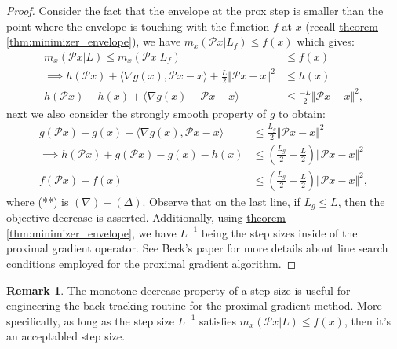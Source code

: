 \documentclass[]{article}
\theoremstyle{definition}
\newtheorem{remark}{Remark}[subsection]
{
    \newtheorem{assumption}{Assumption}
}
\begin{document}
        \begin{proof}Consider the fact that the envelope at the prox step is smaller than the point where the envelope is touching with the function $f$ at $x$ (recall \hyperref[thm:minimizer_envelope]{theorem \ref*{thm:minimizer_envelope}}), we have $m_x(\mathcal Px|L_f)\le f(x)$ which gives: 
            \begin{align*}
                m_x(\mathcal Px|L) \le m_x(\mathcal Px|L_f) 
                &\le f(x)
                \\
                \implies h(\mathcal Px)+ 
                \langle \nabla g(x), \mathcal P x - x\rangle + \frac{L}{2}\Vert \mathcal Px - x\Vert^2 
                &\le h(x)
                \\
                h(\mathcal Px) - h(x) + \langle \nabla g(x) - \mathcal Px - x\rangle 
                &\le \frac{-L}{2} \Vert \mathcal Px - x\Vert^2, \tag{$\Delta$}
            \end{align*}
            next we also consider the strongly smooth property of $g$ to obtain: 
            \begin{align*}
                g(\mathcal Px) - g(x) - \langle \nabla g(x), \mathcal Px - x\rangle 
                & \le \frac{L_g}{2}\Vert \mathcal Px - x\Vert^2 \tag{$\nabla$}
                \\
                \implies
                h(\mathcal Px) + g(\mathcal Px) - g(x) - h(x)
                &\le 
                \left(
                    \frac{L_g}{2} - \frac{L}{2}
                \right)\Vert \mathcal Px - x\Vert^2 \tag{**}
                \\
                f(\mathcal Px) - f(x) 
                &\le
                \left(
                    \frac{L_g}{2} - \frac{L}{2}
                \right)\Vert \mathcal Px - x\Vert^2, 
            \end{align*}
            where (**) is $(\nabla) + (\Delta)$. Observe that on the last line, if $L_g \le L$, then the objective decrease is asserted. Additionally, using \hyperref[thm:minimizer_envelope]{theorem \ref*{thm:minimizer_envelope}}, we have $L^{-1}$ being the step sizes inside of the proximal gradient operator. See Beck's paper \cite{paper:FISTA} for more details about line search conditions employed for the proximal gradient algorithm.
        \end{proof}
        \begin{remark}
            The monotone decrease property of a step size is useful for engineering the back tracking routine for the proximal gradient method. More specifically, as long as the step size $L^{-1}$ satisfies $m_x(\mathcal Px | L)\le f(x)$, then it's an acceptabled step size. 
        \end{remark}
\end{document}
